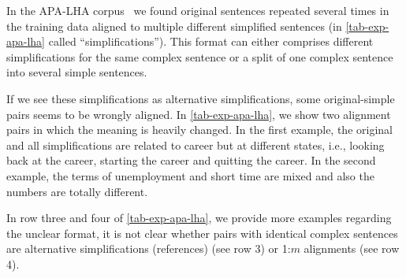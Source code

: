 \documentclass[11pt]{article}
\begin{document}
In the APA-LHA corpus~\cite{spring-etal-2021-exploring} we found original sentences repeated several times in the training data aligned to multiple different simplified sentences (in \autoref{tab-exp-apa-lha} called ``simplifications''). This format can either comprises different simplifications for the same complex sentence or a split of one complex sentence into several simple sentences.\par 
If we see these simplifications as alternative simplifications, some original-simple pairs seems to be wrongly aligned.  In \autoref{tab-exp-apa-lha}, we show two alignment pairs in which the meaning is heavily changed. In the first example, the original and all simplifications are related to career but at different states, i.e., looking back at the career, starting the career and quitting the career. In the second example, the terms of unemployment and short time are mixed and also the numbers are totally different. 

In row three and four of \autoref{tab-exp-apa-lha}, we provide more examples regarding the unclear format, it is not clear whether pairs with identical complex sentences are alternative simplifications (references) (see row 3) or 1:$m$ alignments (see row 4). 
\end{document}
